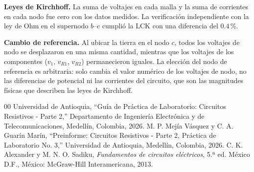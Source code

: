 \documentclass[conference,10pt]{IEEEtran}
\begin{document}
\textbf{Leyes de Kirchhoff.} La suma de voltajes en cada malla y la suma de corrientes en cada nodo fue cero con los datos medidos. La verificación independiente con la ley de Ohm en el supernodo $b$--$c$ cumplió la LCK con una diferencia del $0.4\,\%$.

\textbf{Cambio de referencia.} Al ubicar la tierra en el nodo $c$, todos los voltajes de nodo se desplazaron en una misma cantidad, mientras que los voltajes de los componentes ($v_1$, $v_{R1}$, $v_{R2}$) permanecieron iguales. La elección del nodo de referencia es arbitraria: solo cambia el valor numérico de los voltajes de nodo, no las diferencias de potencial ni las corrientes del circuito, que son las magnitudes físicas que describen las leyes de Kirchhoff.

\begin{thebibliography}{00}
  Universidad de Antioquia, ``Guía de Práctica de Laboratorio: Circuitos Resistivos - Parte 2,'' Departamento de Ingeniería Electrónica y de Telecomunicaciones, Medellín, Colombia, 2026.
  M. P. Mejía Vásquez y C. A. Guarín Marín, ``Preinforme: Circuitos Resistivos - Parte 2, Práctica de Laboratorio No. 3,'' Universidad de Antioquia, Medellín, Colombia, 2026.
  C. K. Alexander y M. N. O. Sadiku, \emph{Fundamentos de circuitos eléctricos}, 5.ª ed. México D.F., México: McGraw-Hill Interamericana, 2013.
\end{thebibliography}
\end{document}
